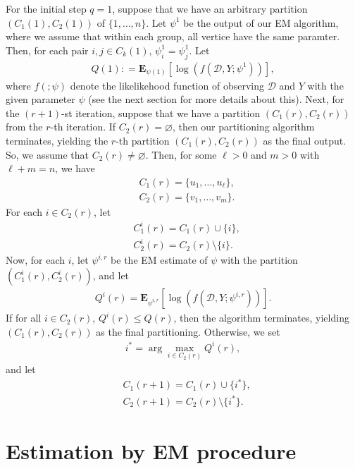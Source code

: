 \documentclass[12pt]{article}%
\begin{document}
For the initial step $q=1$, suppose that we have 
an arbitrary partition $(C_1(1), C_2(1))$ of $\{1,\ldots, n\}$. 
Let $\psi^1$ be the output of our EM algorithm, where we assume that within each group,
all vertice have the same paramter.  Then, for each pair $i, j \in C_k(1)$, $\psi_i^1 = \psi_j^1$.  
Let
\begin{eqnarray}
Q(1) : = \mathbf E_{\psi(1)}\left[\log(f(\mathcal D, Y;\psi^1))\right],
\end{eqnarray}
where $f(;\psi)$ denote the likelikehood function of observing $\mathcal D$ and $Y$ with the given parameter $\psi$ (see the next section for more details about this). 
Next, for the $(r+1)$-st iteration, suppose that we have a partition $(C_1(r), C_2(r))$ from the $r$-th iteration. 
If $C_2(r) = \varnothing$, then our partitioning algorithm terminates, yielding the $r$-th partition 
$(C_1(r), C_2(r))$ as the final output.  So, we assume that $C_2(r)\neq \varnothing$.  Then, for some $\ell > 0$ and $m > 0$ with $\ell + m = n$, we have 
\begin{eqnarray}
&C_1(r) = \{u_1,\ldots, u_\ell\},\\
&C_2(r) = \{v_1,\ldots, v_m\}.
\end{eqnarray} 
For each $i \in C_2(r)$, let 
\begin{eqnarray}
&C_1^{i}(r) = C_1(r) \cup \{i\}, \\
&C_2^{i}(r) = C_2(r) \setminus \{i\}.
\end{eqnarray}
Now, for each $i$, let $\psi^{i,r}$ be the EM estimate of $\psi$ with the partition $(C_1^{i}(r), C_2^{i}(r))$, and let 
\begin{eqnarray}
Q^{i}(r) = \mathbf E_{\psi^{i,r}}\left[\log(f(\mathcal D,Y;\psi^{i,r}))\right].
\end{eqnarray}
If for all $i \in C_2(r)$, $Q^{i}(r) \le Q(r)$, then the algorithm terminates, yielding 
$(C_1(r), C_2(r))$ as the final partitioning.  Otherwise, we set 
\begin{eqnarray}
i^* = \arg\max_{i \in C_2(r)} Q^{i}(r),
\end{eqnarray}
and let 
\begin{eqnarray}
&C_1(r+1) = C_1(r) \cup \{i^*\},\\
&C_2(r+1) = C_2(r) \setminus \{i^*\}.
\end{eqnarray}

\section{Estimation by EM procedure}
\end{document}

